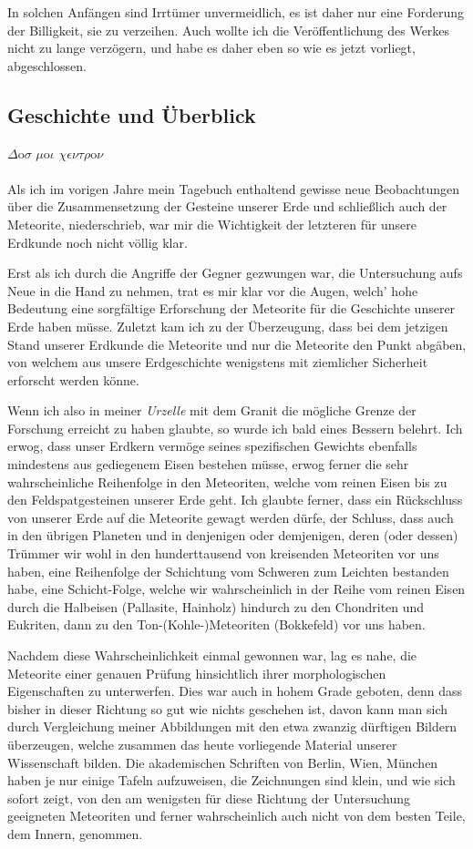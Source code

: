 \documentclass[a4paper, 12pt, oneside]{article}
\begin{document}
In solchen Anfängen sind Irrtümer unvermeidlich, es ist daher nur eine Forderung der Billigkeit, sie zu verzeihen. Auch wollte ich die Veröffentlichung des Werkes nicht zu lange verzögern, und habe es daher eben so wie es jetzt vorliegt, abgeschlossen.
\clearpage
\subsection{Geschichte und Überblick}
$\Delta$o$\sigma$ $\mu$o$\iota$ $\chi\epsilon\nu\tau\rho$o$\nu$%
\paragraph{}
Als ich im vorigen Jahre mein Tagebuch enthaltend gewisse neue Beobachtungen über die Zusammensetzung der Gesteine unserer Erde und schließlich auch der Meteorite, niederschrieb, war mir die Wichtigkeit der letzteren für unsere Erdkunde noch nicht völlig klar.

Erst als ich durch die Angriffe der Gegner gezwungen war, die Untersuchung aufs Neue in die Hand zu nehmen, trat es mir klar vor die Augen, welch' hohe Bedeutung eine sorgfältige Erforschung der Meteorite für die Geschichte unserer Erde haben müsse. Zuletzt kam ich zu der Überzeugung, dass bei dem jetzigen Stand unserer Erdkunde die Meteorite und nur die Meteorite den Punkt abgäben, von welchem aus unsere Erdgeschichte wenigstens mit ziemlicher Sicherheit erforscht werden könne.

Wenn ich also in meiner \emph{Urzelle} mit dem Granit die mögliche Grenze der Forschung erreicht zu haben glaubte, so wurde ich bald eines Bessern belehrt. Ich erwog, dass unser Erdkern vermöge seines spezifischen Gewichts ebenfalls mindestens aus gediegenem Eisen bestehen müsse, erwog ferner die sehr wahrscheinliche Reihenfolge in den Meteoriten, welche vom reinen Eisen bis zu den Feldspatgesteinen unserer Erde geht. Ich glaubte ferner, dass ein Rückschluss von unserer Erde auf die Meteorite gewagt werden dürfe, der Schluss, dass auch in den übrigen Planeten und in denjenigen oder demjenigen, deren (oder dessen) Trümmer wir wohl in den hunderttausend von kreisenden Meteoriten vor uns haben, eine Reihenfolge der Schichtung vom Schweren zum Leichten bestanden habe, eine Schicht-Folge, welche wir wahrscheinlich in der Reihe vom reinen Eisen durch die Halbeisen (Pallasite, Hainholz) hindurch zu den Chondriten und Eukriten, dann zu den Ton-(Kohle-)Meteoriten (Bokkefeld) vor uns haben.

Nachdem diese Wahrscheinlichkeit einmal gewonnen war, lag es nahe, die Meteorite einer genauen Prüfung hinsichtlich ihrer morphologischen Eigenschaften zu unterwerfen. Dies war auch in hohem Grade geboten, denn dass bisher in dieser Richtung so gut wie nichts geschehen ist, davon kann man sich durch Vergleichung meiner Abbildungen mit den etwa zwanzig dürftigen Bildern überzeugen, welche zusammen das heute vorliegende Material unserer Wissenschaft bilden. Die akademischen Schriften von Berlin, Wien, München haben je nur einige Tafeln aufzuweisen, die Zeichnungen sind klein, und wie sich sofort zeigt, von den am wenigsten für diese Richtung der Untersuchung geeigneten Meteoriten und ferner wahrscheinlich auch nicht von dem besten Teile, dem Innern, genommen.
\end{document}
